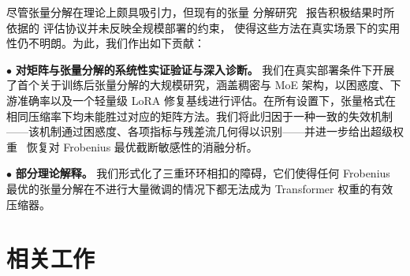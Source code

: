 \documentclass[11pt]{article}
\begin{document}
\begin{mainpart}

尽管张量分解在理论上颇具吸引力，但现有的张量
分解研究~\citep{tensorllm2025,li2026lestd} 报告积极结果时所依据的
评估协议并未反映全规模部署的约束，
使得这些方法在真实场景下的实用性仍不明朗。为此，我们作出如下贡献：

$\bullet$ \textbf{对矩阵与张量分解的系统性实证验证与深入诊断。} 我们在真实部署条件下开展了首个关于训练后张量分解的大规模研究，涵盖稠密与 MoE 架构，以困惑度、下游准确率以及一个轻量级 LoRA 修复基线进行评估。在所有设置下，张量格式在相同压缩率下均未能胜过对应的矩阵方法。我们将此归因于一种一致的失效机制——该机制通过困惑度、各项指标与残差流几何得以识别——并进一步给出超级权重~\citep{superweight} 恢复对 Frobenius 最优截断敏感性的消融分析。

$\bullet$ \textbf{部分理论解释。} 我们形式化了三重环环相扣的障碍，它们使得任何 Frobenius 最优的张量分解在不进行大量微调的情况下都无法成为 Transformer 权重的有效压缩器。

\section{相关工作}


\end{mainpart}
\end{document}
